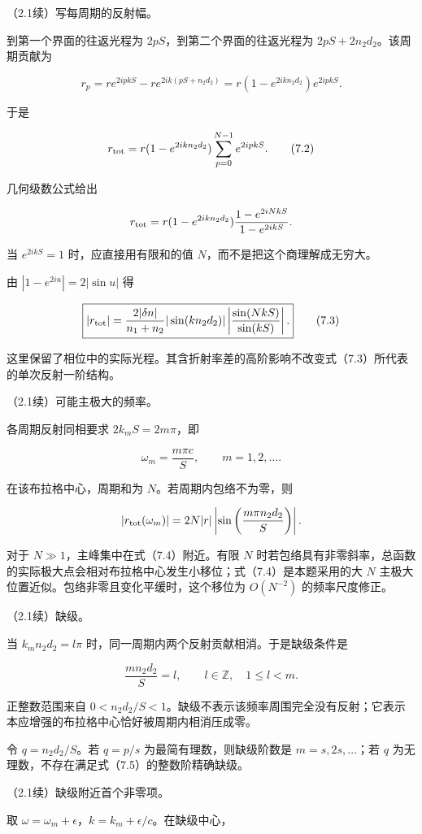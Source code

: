 \documentclass[12pt,a4paper,fontset=fandol]{ctexart}
\begin{document}
（2.1续）写每周期的反射幅。

到第一个界面的往返光程为 \(2pS\)，到第二个界面的往返光程为
\(2pS+2n_2d_2\)。该周期贡献为

\[
r_p=r e^{2ipkS}-r e^{2ik(pS+n_2d_2)}
=r(1-e^{2ikn_2d_2})e^{2ipkS}.
\]

于是

\[
r_{\rm tot}=r(1-e^{2ikn_2d_2})
\sum_{p=0}^{N-1}e^{2ipkS}.
\tag{7.2}
\]

几何级数公式给出

\[
r_{\rm tot}=r(1-e^{2ikn_2d_2})
\frac{1-e^{2iNkS}}{1-e^{2ikS}}.
\]

当 \(e^{2ikS}=1\) 时，应直接用有限和的值
\(N\)，而不是把这个商理解成无穷大。

由 \(|1-e^{2iu}|=2|\sin u|\) 得

\[
\boxed{|r_{\rm tot}|=
\frac{2|\delta n|}{n_1+n_2}|\sin(kn_2d_2)|
\left|\frac{\sin(NkS)}{\sin(kS)}\right|.}
\tag{7.3}
\]

这里保留了相位中的实际光程。其含折射率差的高阶影响不改变式（7.3）所代表的单次反射一阶结构。

（2.1续）可能主极大的频率。

各周期反射同相要求 \(2k_mS=2m\pi\)，即

\[
\boxed{\omega_m=\frac{m\pi c}{S},\qquad m=1,2,\ldots.}
\tag{7.4}
\]

在该布拉格中心，周期和为 \(N\)。若周期内包络不为零，则

\[
|r_{\rm tot}(\omega_m)|
=2N|r|\left|\sin\left(\frac{m\pi n_2d_2}{S}\right)\right|.
\]

对于 \(N\gg1\)，主峰集中在式（7.4）附近。有限 \(N\)
时若包络具有非零斜率，总函数的实际极大点会相对布拉格中心发生小移位；式（7.4）是本题采用的大
\(N\) 主极大位置近似。包络非零且变化平缓时，这个移位为 \(O(N^{-2})\)
的频率尺度修正。

（2.1续）缺级。

当 \(k_mn_2d_2=l\pi\) 时，同一周期内两个反射贡献相消。于是缺级条件是

\[
\boxed{\frac{m n_2d_2}{S}=l,\qquad
l\in\mathbb Z,\quad 1\le l<m.}
\tag{7.5}
\]

正整数范围来自
\(0<n_2d_2/S<1\)。缺级不表示该频率周围完全没有反射；它表示本应增强的布拉格中心恰好被周期内相消压成零。

令 \(q=n_2d_2/S\)。若 \(q=p/s\) 为最简有理数，则缺级阶数是
\(m=s,2s,\ldots\)；若 \(q\)
为无理数，不存在满足式（7.5）的整数阶精确缺级。

（2.1续）缺级附近首个非零项。

取 \(\omega=\omega_m+\epsilon\)，\(k=k_m+\epsilon/c\)。在缺级中心，
\end{document}
